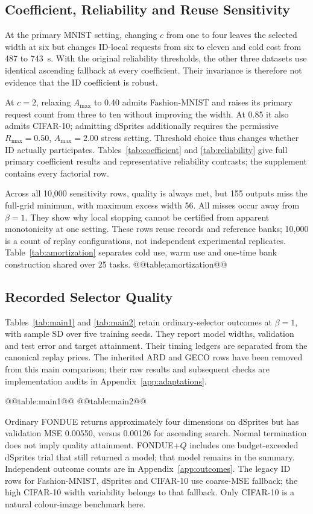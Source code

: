 \subsection{Coefficient, Reliability and Reuse Sensitivity}\label{sec:idsensitivity}
At the primary MNIST setting, changing $c$ from one to four leaves the
selected width at six but changes ID-local requests from six to eleven
and cold cost from 487 to 743~s. With the original reliability thresholds,
the other three datasets use identical ascending fallback at every
coefficient. Their invariance is therefore not evidence that the ID
coefficient is robust.

At $c=2$, relaxing $A_{\max}$ to 0.40 admits Fashion-MNIST and raises its
primary request count from three to ten without improving the width.
At 0.85 it also admits CIFAR-10; admitting dSprites additionally requires
the permissive $R_{\max}=0.50$, $A_{\max}=2.00$ stress setting.
Threshold choice thus changes whether ID actually participates.
Tables~\ref{tab:coefficient} and \ref{tab:reliability} give full primary
coefficient results and representative reliability contrasts; the
supplement contains every factorial row.

Across all 10,000 sensitivity rows, quality is always met, but 155
outputs miss the full-grid minimum, with maximum excess width 56.
All misses occur away from $\beta=1$. They show why local stopping
cannot be certified from apparent monotonicity at one setting.
These rows reuse records and reference banks; 10,000 is a count of
replay configurations, not independent experimental replicates.
Table~\ref{tab:amortization} separates cold use, warm use and one-time
bank construction shared over 25 tasks.
@@table:amortization@@

\subsection{Recorded Selector Quality}
Tables~\ref{tab:main1} and \ref{tab:main2} retain ordinary-selector
outcomes at $\beta=1$, with sample SD over five training seeds.
They report model widths, validation and test error and target attainment.
Their timing ledgers are separated from the canonical replay prices.
The inherited ARD and GECO rows have been removed from this main
comparison; their raw results and subsequent checks are implementation
audits in Appendix~\ref{app:adaptations}.

@@table:main1@@
@@table:main2@@

Ordinary FONDUE returns approximately four dimensions on dSprites
but has validation MSE 0.00550, versus 0.00126 for ascending search.
Normal termination does not imply quality attainment. FONDUE+$Q$
includes one budget-exceeded dSprites trial that still returned a model;
that model remains in the summary. Independent outcome counts are in
Appendix~\ref{app:outcomes}. The legacy ID rows for Fashion-MNIST,
dSprites and CIFAR-10 use coarse-MSE fallback; the high CIFAR-10 width
variability belongs to that fallback. Only CIFAR-10 is a natural
colour-image benchmark here.

